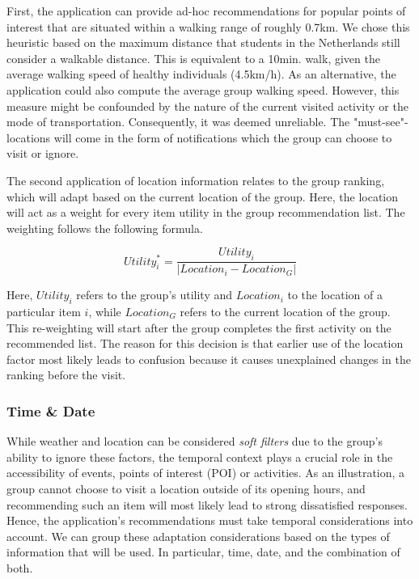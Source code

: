 \documentclass[11pt,a4paper,oneside]{article}
\begin{document}
First, the application can provide ad-hoc recommendations for popular points of interest that are situated within a walking range of roughly 0.7km. We chose this heuristic based on the maximum distance that students in the Netherlands still consider a walkable distance.\cite{ton_CyclingWalkingDeterminants_2019} This is equivalent to a 10min. walk, given the average walking speed of healthy individuals (4.5km/h).\cite{schimpl_AssociationWalkingSpeed_2011} As an alternative, the application could also compute the average group walking speed. However, this measure might be confounded by the nature of the current visited activity or the mode of transportation. Consequently, it was deemed unreliable. The "must-see"-locations will come in the form of notifications which the group can choose to visit or ignore. 

The second application of location information relates to the group ranking, which will adapt based on the current location of the group. Here, the location will act as a weight for every item utility in the group recommendation list. The weighting follows the following formula.

\begin{equation}
    Utility_{i}^* = \frac{Utility_i}{\lvert Location_i - Location_G \rvert}
\end{equation}

Here, $Utility_i$ refers to the group's utility and $Location_i$ to the location of a particular item $i$, while $Location_G$ refers to the current location of the group. This re-weighting will start after the group completes the first activity on the recommended list. The reason for this decision is that earlier use of the location factor most likely leads to confusion because it causes unexplained changes in the ranking before the visit. 


\subsubsection{Time \& Date}
While weather and location can be considered \emph{soft filters} due to the group's ability to ignore these factors, the temporal context plays a crucial role in the accessibility of events, points of interest (POI) or activities. As an illustration, a group cannot choose to visit a location outside of its opening hours, and recommending such an item will most likely lead to strong dissatisfied responses. Hence, the application's recommendations must take temporal considerations into account. We can group these adaptation considerations based on the types of information that will be used. In particular, time, date, and the combination of both. 
\end{document}
